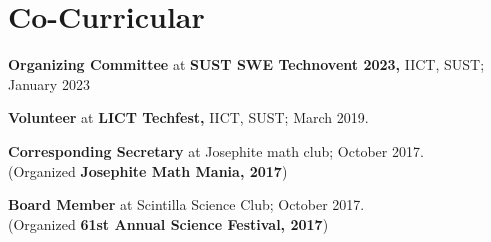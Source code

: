 \documentclass[]{deedy-resume-openfont}
\begin{document}
\begin{minipage}[t]{0.57\textwidth}
\section{Co-Curricular} 
\linesep
\vspace{-5pt}
\begin{tightemize}
\item \textbf{Organizing Committee} at \textbf{SUST SWE Technovent 2023,} IICT, SUST;
January 2023
\item \textbf{Volunteer} at \textbf{LICT Techfest,} IICT, SUST;
March 2019.
\item \textbf{Corresponding Secretary} at Josephite math club;
October 2017.\\
(Organized \textbf{Josephite Math Mania, 2017})
\item \textbf{Board Member} at Scintilla Science Club; October 2017.\\
(Organized \textbf{61st Annual Science Festival, 2017})
\end{tightemize}
\sectionsep



\end{minipage} 
\end{document}
